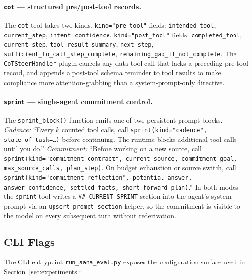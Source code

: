 \paragraph{\texttt{cot} --- structured pre/post-tool records.} The \texttt{cot} tool takes two kinds. \texttt{kind="pre\_tool"} fields: \texttt{intended\_tool}, \texttt{current\_step}, \texttt{intent}, \texttt{confidence}. \texttt{kind="post\_tool"} fields: \texttt{completed\_tool}, \texttt{current\_step}, \texttt{tool\_result\_summary}, \texttt{next\_step}, \texttt{sufficient\_to\_call\_step\_complete}, \texttt{remaining\_gap\_if\_not\_complete}. The \texttt{CoTSteerHandler} plugin cancels any data-tool call that lacks a preceding pre-tool record, and appends a post-tool schema reminder to tool results to make compliance more attention-grabbing than a system-prompt-only directive.

\paragraph{\texttt{sprint} --- single-agent commitment control.} The \texttt{sprint\_block()} function emits one of two persistent prompt blocks. \emph{Cadence:} ``Every $k$ counted tool calls, call \texttt{sprint(kind="cadence", state\_of\_task=\dots)} before continuing. The runtime blocks additional tool calls until you do.'' \emph{Commitment:} ``Before working on a new source, call \texttt{sprint(kind="commitment\_contract", current\_source, commitment\_goal, max\_source\_calls, plan\_step)}. On budget exhaustion or source switch, call \texttt{sprint(kind="commitment\_reflection", potential\_answer, answer\_confidence, settled\_facts, short\_forward\_plan)}.'' In both modes the \texttt{sprint} tool writes a \texttt{\#\# CURRENT SPRINT} section into the agent's system prompt via an \texttt{upsert\_prompt\_section} helper, so the commitment is visible to the model on every subsequent turn without rederivation.

\subsection{CLI Flags}

The CLI entrypoint \texttt{run\_sana\_eval.py} exposes the configuration surface used in Section~\ref{sec:experiments}:

